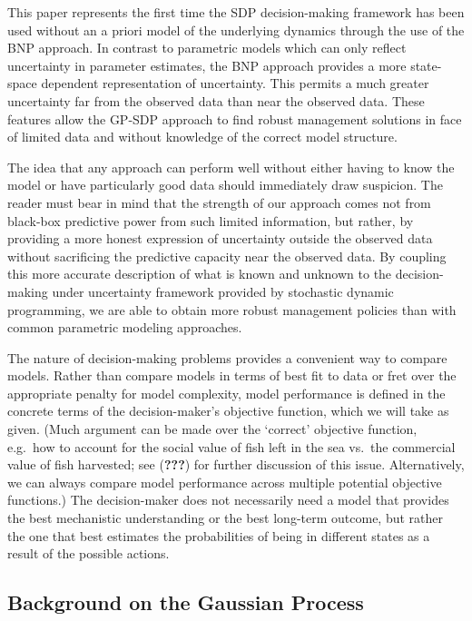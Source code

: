 \documentclass[author-year, review]{elsarticle} %
\begin{document}
This paper represents the first time the SDP decision-making framework
has been used without an a priori model of the underlying dynamics
through the use of the BNP approach. In contrast to parametric models
which can only reflect uncertainty in parameter estimates, the BNP
approach provides a more state-space dependent representation of
uncertainty. This permits a much greater uncertainty far from the
observed data than near the observed data. These features allow the
GP-SDP approach to find robust management solutions in face of limited
data and without knowledge of the correct model structure.

The idea that any approach can perform well without either having to
know the model or have particularly good data should immediately draw
suspicion. The reader must bear in mind that the strength of our
approach comes not from black-box predictive power from such limited
information, but rather, by providing a more honest expression of
uncertainty outside the observed data without sacrificing the predictive
capacity near the observed data. By coupling this more accurate
description of what is known and unknown to the decision-making under
uncertainty framework provided by stochastic dynamic programming, we are
able to obtain more robust management policies than with common
parametric modeling approaches.

The nature of decision-making problems provides a convenient way to
compare models. Rather than compare models in terms of best fit to data
or fret over the appropriate penalty for model complexity, model
performance is defined in the concrete terms of the decision-maker's
objective function, which we will take as given. (Much argument can be
made over the `correct' objective function, e.g.~how to account for the
social value of fish left in the sea vs.~the commercial value of fish
harvested; see ({\textbf{???}}) for further discussion of this issue.
Alternatively, we can always compare model performance across multiple
potential objective functions.) The decision-maker does not necessarily
need a model that provides the best mechanistic understanding or the
best long-term outcome, but rather the one that best estimates the
probabilities of being in different states as a result of the possible
actions.

\subsection{Background on the Gaussian
Process}\label{background-on-the-gaussian-process}
\end{document}
